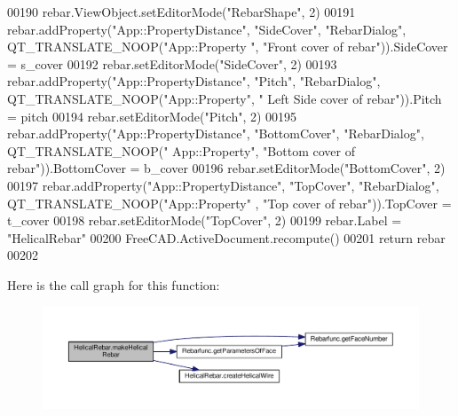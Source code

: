 \begin{DoxyCode}
00190     rebar.ViewObject.setEditorMode(\textcolor{stringliteral}{"RebarShape"}, 2)
00191     rebar.addProperty(\textcolor{stringliteral}{"App::PropertyDistance"}, \textcolor{stringliteral}{"SideCover"}, \textcolor{stringliteral}{"RebarDialog"}, QT\_TRANSLATE\_NOOP(\textcolor{stringliteral}{"App::Property
      "}, \textcolor{stringliteral}{"Front cover of rebar"})).SideCover = s\_cover
00192     rebar.setEditorMode(\textcolor{stringliteral}{"SideCover"}, 2)
00193     rebar.addProperty(\textcolor{stringliteral}{"App::PropertyDistance"}, \textcolor{stringliteral}{"Pitch"}, \textcolor{stringliteral}{"RebarDialog"}, QT\_TRANSLATE\_NOOP(\textcolor{stringliteral}{"App::Property"}, \textcolor{stringliteral}{"
      Left Side cover of rebar"})).Pitch = pitch
00194     rebar.setEditorMode(\textcolor{stringliteral}{"Pitch"}, 2)
00195     rebar.addProperty(\textcolor{stringliteral}{"App::PropertyDistance"}, \textcolor{stringliteral}{"BottomCover"}, \textcolor{stringliteral}{"RebarDialog"}, QT\_TRANSLATE\_NOOP(\textcolor{stringliteral}{"
      App::Property"}, \textcolor{stringliteral}{"Bottom cover of rebar"})).BottomCover = b\_cover
00196     rebar.setEditorMode(\textcolor{stringliteral}{"BottomCover"}, 2)
00197     rebar.addProperty(\textcolor{stringliteral}{"App::PropertyDistance"}, \textcolor{stringliteral}{"TopCover"}, \textcolor{stringliteral}{"RebarDialog"}, QT\_TRANSLATE\_NOOP(\textcolor{stringliteral}{"App::Property"}
      , \textcolor{stringliteral}{"Top cover of rebar"})).TopCover = t\_cover
00198     rebar.setEditorMode(\textcolor{stringliteral}{"TopCover"}, 2)
00199     rebar.Label = \textcolor{stringliteral}{"HelicalRebar"}
00200     FreeCAD.ActiveDocument.recompute()
00201     \textcolor{keywordflow}{return} rebar
00202 
\end{DoxyCode}


Here is the call graph for this function\+:\nopagebreak
\begin{figure}[H]
\begin{center}
\leavevmode
\includegraphics[width=350pt]{namespaceHelicalRebar_a8a4f12ed70819996ac31877957dfab08_cgraph}
\end{center}
\end{figure}




